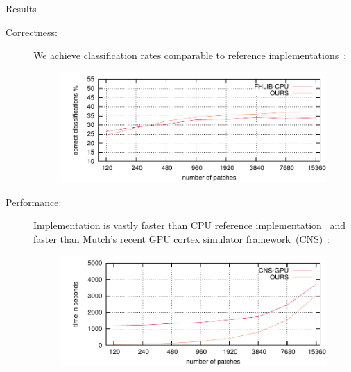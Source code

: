 \documentclass[final]{beamer}
\begin{document}
\begin{frame}{}
\begin{columns}[t]
\begin{column}{.48\linewidth}
        \begin{block}{Results}
				\begin{description}
				\item[ 	Correctness: ]
 We achieve classification rates comparable to reference implementations~\cite{mutch06,mutch10}:				
				\begin{figure}[htb]
				  \centering
				    \includegraphics[scale=2]{images/PNumAcry_min} 
				\end{figure}
		\item[ 	Performance: ]
	Implementation is vastly faster than CPU reference implementation~\cite{mutch06} and faster than Mutch's recent GPU cortex simulator framework~(CNS)~\cite{mutch10}:
		\begin{figure}[htb]
		  \centering
		    \includegraphics[scale=2]{images/PNumTime_max} 
		\end{figure}
		\end{description}

\end{block}
\end{column}
\end{columns}
\end{frame}
\end{document}
